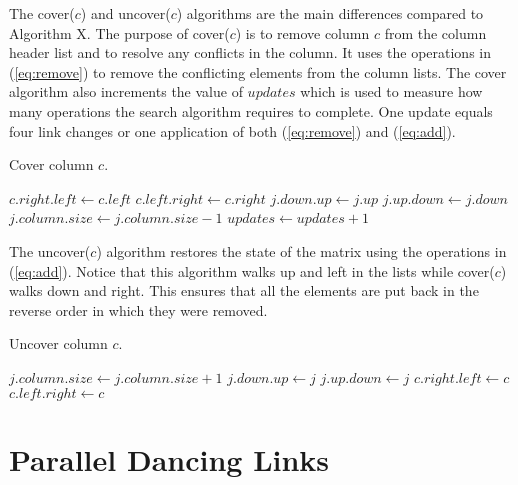 The cover($c$) and uncover($c$) algorithms are the main differences compared to Algorithm X.
The purpose of cover($c$) is to remove column $c$ from the column header list and to resolve any conflicts in the column.
It uses the operations in (\ref{eq:remove}) to remove the conflicting elements from the column lists.
The cover algorithm also increments the value of $updates$ which is used to measure how many operations the search algorithm requires to complete.
One update equals four link changes or one application of both (\ref{eq:remove}) and (\ref{eq:add}).
\begin{algorithm}[H]
	\caption{Cover column $c$.}
	\label{dlx_cover}
	\begin{distribalgo}[1]
			\STATE $c.right.left \leftarrow c.left$
			\STATE $c.left.right \leftarrow c.right$
					\STATE $j.down.up \leftarrow j.up$
					\STATE $j.up.down \leftarrow j.down$
					\STATE $j.column.size \leftarrow j.column.size - 1$
					\STATE $updates \leftarrow updates + 1$
				\ENDFOR
			\ENDFOR
		\ENDPROC
	\end{distribalgo}
\end{algorithm}

The uncover($c$) algorithm restores the state of the matrix using the operations in (\ref{eq:add}).
Notice that this algorithm walks up and left in the lists while cover($c$) walks down and right.
This ensures that all the elements are put back in the reverse order in which they were removed.
\begin{algorithm}[H]
	\caption{Uncover column $c$.}
	\label{dlx_uncover}
	\begin{distribalgo}[1]
					\STATE $j.column.size \leftarrow j.column.size + 1$
					\STATE $j.down.up \leftarrow j$
					\STATE $j.up.down \leftarrow j$
				\ENDFOR
			\ENDFOR
			\STATE $c.right.left \leftarrow c$
			\STATE $c.left.right \leftarrow c$
		\ENDPROC
	\end{distribalgo}
\end{algorithm}



\section{Parallel Dancing Links}

